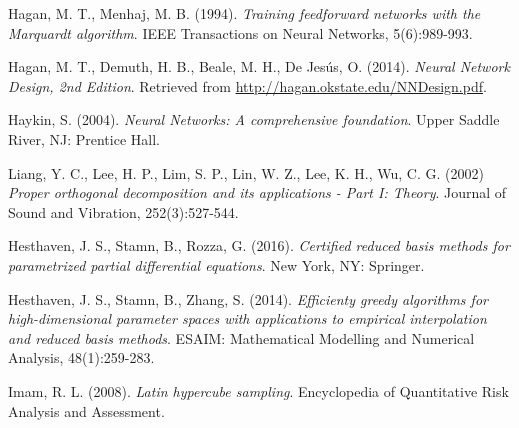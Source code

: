 \documentclass{elsarticle}
\numberwithin{equation}{section}
\theoremstyle{theorem}
\theoremstyle{definition}
\theoremstyle{remark}
\theoremstyle{proposition}
\numberwithin{figure}{section}
\begin{document}
\begin{thebibliography}{50}
		
		Hagan, M. T., Menhaj, M. B. (1994). \emph{Training feedforward networks with the Marquardt algorithm}. IEEE Transactions on Neural Networks, 5(6):989-993.
		
		Hagan, M. T., Demuth, H. B., Beale, M. H., De Jes\'us, O. (2014). \emph{Neural Network Design, 2nd Edition}. Retrieved from \url{http://hagan.okstate.edu/NNDesign.pdf}.
		
		
		Haykin, S. (2004). \emph{Neural Networks: A comprehensive foundation}. Upper Saddle River, NJ: Prentice Hall.
		
		
		Liang, Y. C., Lee, H. P., Lim, S. P., Lin, W. Z., Lee, K. H., Wu, C. G. (2002) \emph{Proper orthogonal decomposition and its applications - Part I: Theory}. Journal of Sound and Vibration, 252(3):527-544.
		
		
		Hesthaven, J. S., Stamn, B., Rozza, G. (2016). \emph{Certified reduced basis methods for parametrized partial differential equations}. New York, NY: Springer.
		
		Hesthaven, J. S., Stamn, B., Zhang, S. (2014). \emph{Efficienty greedy algorithms for high-dimensional parameter spaces with applications to empirical interpolation and reduced basis methods}. ESAIM: Mathematical Modelling and Numerical Analysis, 48(1):259-283.
		
		
		Imam, R. L. (2008). \emph{Latin hypercube sampling}. Encyclopedia of Quantitative Risk Analysis and Assessment.
		

\end{thebibliography}
\end{document}
